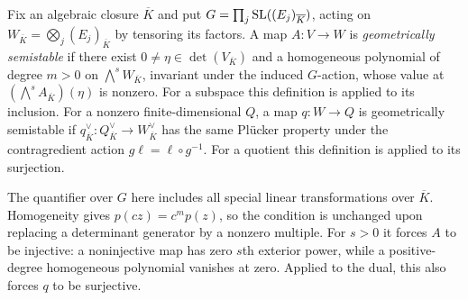 \begin{definition}
\label{def:geometric-semistability}
\leanok
Fix an algebraic closure $\overline K$ and put
$G=\prod_j\operatorname{SL}((E_j)_{\overline K})$, acting on
$W_{\overline K}=\bigotimes_j(E_j)_{\overline K}$ by tensoring its factors.
A map $A:V\to W$ is \emph{geometrically semistable} if there exist
$0\ne\eta\in\det(V_{\overline K})$ and a homogeneous polynomial of degree
$m>0$ on $\bigwedge^s W_{\overline K}$, invariant under the induced $G$-action,
whose value at $(\bigwedge^s A_{\overline K})(\eta)$ is nonzero.
For a subspace this definition is applied to its inclusion.
For a nonzero finite-dimensional $Q$, a map $q:W\to Q$ is geometrically
semistable if $q_{\overline K}^\vee:Q_{\overline K}^\vee\to W_{\overline K}^\vee$
has the same Pl\"ucker property under the contragredient action
$g\ell=\ell\circ g^{-1}$. For a quotient this definition is applied to its
surjection.
\end{definition}

The quantifier over $G$ here includes all special linear transformations over
$\overline K$. Homogeneity gives $p(cz)=c^m p(z)$, so the condition is
unchanged upon replacing a determinant generator by a nonzero multiple.
For $s>0$ it forces $A$ to be injective: a noninjective map has zero $s$th
exterior power, while a positive-degree homogeneous polynomial vanishes at
zero. Applied to the dual, this also forces $q$ to be surjective.

